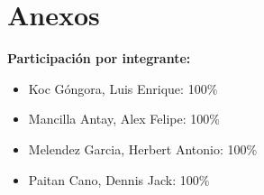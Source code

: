 \documentclass[12pt]{article}
\begin{document}
        \newpage
        \section*{Anexos}
        \textbf{Participación por integrante:}
        \begin{itemize}
                \item Koc Góngora, Luis Enrique: 100\%
                \item Mancilla Antay, Alex Felipe: 100\%
                \item Melendez Garcia, Herbert Antonio: 100\%
                \item Paitan Cano, Dennis Jack: 100\%
        \end{itemize}
        
\end{document}
